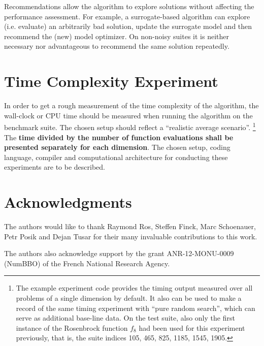 \documentclass[letterpaper,12pt,english]{article}
\begin{document}
Recommendations allow the algorithm to explore solutions without affecting the
performance assessment. For example, a surrogate-based algorithm can explore
(i.e. evaluate) an arbitrarily bad solution, update the surrogate model and
then recommend the (new) model optimizer. On non-noisy suites it is neither
necessary nor advantageous to recommend the same solution repeatedly.


\section{Time Complexity Experiment}
\label{index:time-complexity-experiment}
In order to get a rough measurement of the time complexity of the algorithm,
the wall-clock or CPU time should be measured when running the algorithm on
the benchmark suite. The chosen setup should reflect a ``realistic average
scenario''. \footnote[10]{
The example experiment code provides the timing output measured over all
problems of a single dimension by default. It also can be used to make a record
of the same timing experiment with ``pure random search'', which can serve as
additional base-line data. On the  test suite, also only the
first instance of the Rosenbrock function \(f_8\) had been used for this
experiment previously, that is, the suite indices 105, 465, 825, 1185, 1545,
1905.
} The \textbf{time divided by the number of function evaluations shall be
presented separately for each dimension}. The chosen setup, coding language, compiler and
computational architecture for conducting these experiments are to be described.
\section*{Acknowledgments}
The authors would like to thank Raymond Ros, Steffen Finck, Marc Schoenauer,
Petr Posik and Dejan Tusar for their many invaluable contributions to this work.

The authors also acknowledge support by the grant ANR-12-MONU-0009 (NumBBO)
of the French National Research Agency.
\end{document}
